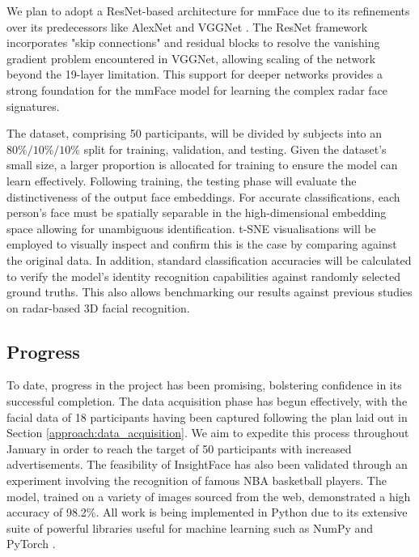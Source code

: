 \documentclass{interim}
\begin{document}
We plan to adopt a ResNet-based architecture for mmFace due to its refinements over its predecessors like AlexNet \cite{krizhevsky2012imagenet} and VGGNet \cite{simonyan2014very}. The ResNet framework \cite{he2016deep} incorporates "skip connections" and residual blocks to resolve the vanishing gradient problem encountered in VGGNet, allowing scaling of the network beyond the 19-layer limitation. This support for deeper networks provides a strong foundation for the mmFace model for learning the complex radar face signatures.

The dataset, comprising 50 participants, will be divided by subjects into an $80\%/10\%/10\%$ split for training, validation, and testing. Given the dataset's small size, a larger proportion is allocated for training to ensure the model can learn effectively. Following training, the testing phase will evaluate the distinctiveness of the output face embeddings. For accurate classifications, each person's face must be spatially separable in the high-dimensional embedding space allowing for unambiguous identification. t-SNE visualisations \cite{van2008visualizing} will be employed to visually inspect and confirm this is the case by comparing against the original data. In addition, standard classification accuracies will be calculated to verify the model's identity recognition capabilities against randomly selected ground truths. This also allows benchmarking our results against previous studies on radar-based 3D facial recognition.


\subsection{Progress}
\label{approach:progress}
To date, progress in the project has been promising, bolstering confidence in its successful completion. The data acquisition phase has begun effectively, with the facial data of 18 participants having been captured following the plan laid out in Section \ref{approach:data_acquisition}. We aim to expedite this process throughout January in order to reach the target of 50 participants with increased advertisements. The feasibility of InsightFace has also been validated through an experiment involving the recognition of famous NBA basketball players. The model, trained on a variety of images sourced from the web, demonstrated a high accuracy of 98.2\%. All work is being implemented in Python due to its extensive suite of powerful libraries useful for machine learning such as NumPy \cite{harris2020array} and PyTorch \cite{paszke2019pytorch}. 
\end{document}
